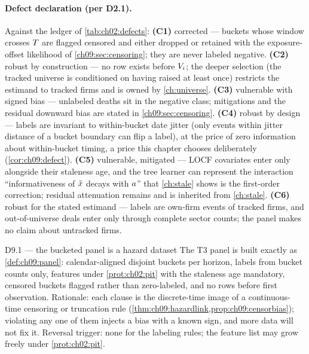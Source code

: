 \paragraph{Defect declaration (per D2.1).} Against the ledger of
\cref{tab:ch02:defects}: \textbf{(C1)} corrected --- buckets whose window
crosses $T$ are flagged censored and either dropped or retained with
the exposure-offset likelihood of \cref{ch09:sec:censoring}; they are
never labeled negative. \textbf{(C2)} robust by construction --- no row
exists before $V_i$; the deeper selection (the tracked universe is
conditioned on having raised at least once) restricts the estimand to
tracked firms and is owned by \cref{ch:universe}. \textbf{(C3)}
vulnerable with signed bias --- unlabeled deaths sit in the negative
class; mitigations and the residual downward bias are stated in
\cref{ch09:sec:censoring}. \textbf{(C4)} robust by design --- labels are
invariant to within-bucket date jitter (only events within jitter
distance of a bucket boundary can flip a label), at the price of zero
information about within-bucket timing, a price this chapter chooses
deliberately (\cref{cor:ch09:defect}). \textbf{(C5)} vulnerable,
mitigated --- LOCF covariates enter only alongside their staleness age,
and the tree learner can represent the interaction ``informativeness of
$\tilde{x}$ decays with $a$'' that \cref{ch:stale} shows is the
first-order correction; residual attenuation remains and is inherited
from \cref{ch:stale}. \textbf{(C6)} robust for the stated estimand ---
labels are own-firm events of tracked firms, and out-of-universe deals
enter only through complete sector counts; the panel makes no claim about
untracked firms.

\begin{decision}{D9.1 --- the bucketed panel is a hazard dataset}
The T3 panel is built exactly as \cref{def:ch09:panel}: calendar-aligned
disjoint buckets per horizon, labels from bucket counts only, features
under \cref{prot:ch02:pit} with the staleness age mandatory, censored
buckets flagged rather than zero-labeled, and no rows before first
observation. Rationale: each clause is the discrete-time image of a
continuous-time censoring or truncation rule
(\cref{thm:ch09:hazardlink,prop:ch09:censorbias}); violating any one of
them injects a bias with a known sign, and more data will not fix it. Reversal trigger:
none for the labeling rules; the feature list may grow freely under
\cref{prot:ch02:pit}.
\end{decision}

